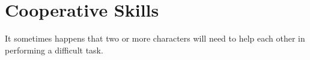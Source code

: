 \section{Cooperative Skills}
It sometimes happens that two or more characters will need to help each other in performing a difficult task.
